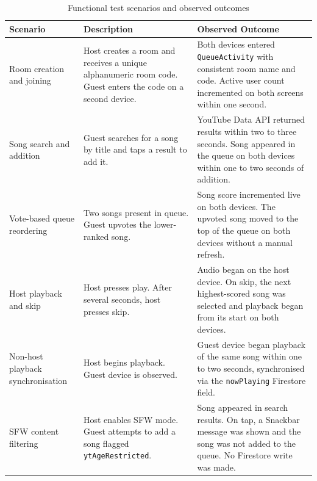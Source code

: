 \documentclass[pdflatex,sn-mathphys-num,iicol]{sn-jnl}
\theoremstyle{thmstyleone}%
\theoremstyle{thmstyletwo}%
\theoremstyle{thmstylethree}%
\begin{document}
\begin{table}[!ht]
\centering
\caption{Functional test scenarios and observed outcomes}
\label{tab:results}
\begin{tabular}{p{3.0cm} p{5.2cm} p{4.6cm}}
\toprule
\textbf{Scenario} & \textbf{Description} & \textbf{Observed Outcome} \\
\midrule

Room creation and joining
& Host creates a room and receives a unique alphanumeric room code. Guest enters
  the code on a second device.
& Both devices entered \texttt{QueueActivity} with consistent room name and code.
  Active user count incremented on both screens within one second. \\

\addlinespace

Song search and addition
& Guest searches for a song by title and taps a result to add it.
& YouTube Data API returned results within two to three seconds. Song appeared in
  the queue on both devices within one to two seconds of addition. \\

\addlinespace

Vote-based queue reordering
& Two songs present in queue. Guest upvotes the lower-ranked song.
& Song score incremented live on both devices. The upvoted song moved to the top
  of the queue on both devices without a manual refresh. \\

\addlinespace

Host playback and skip
& Host presses play. After several seconds, host presses skip.
& Audio began on the host device. On skip, the next highest-scored song was
  selected and playback began from its start on both devices. \\

\addlinespace

Non-host playback synchronisation
& Host begins playback. Guest device is observed.
& Guest device began playback of the same song within one to two seconds,
  synchronised via the \texttt{nowPlaying} Firestore field. \\

\addlinespace

SFW content filtering
& Host enables SFW mode. Guest attempts to add a song flagged
  \texttt{ytAgeRestricted}.
& Song appeared in search results. On tap, a Snackbar message was shown and
  the song was not added to the queue. No Firestore write was made. \\


\end{tabular}
\end{table}
\end{document}
